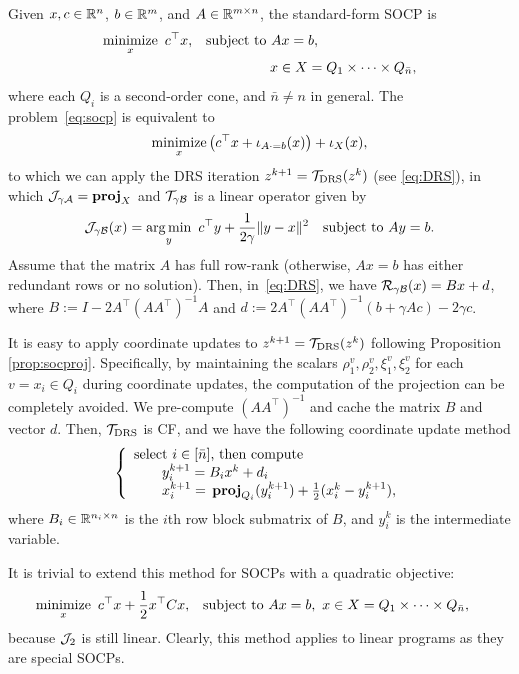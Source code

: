 {{{Given $x,c\in\mathbb{R}^n$, $b\in\mathbb{R}^m$, and $A\in\mathbb{R}^{m\times n}$, the standard-form SOCP is
\begin{subequations}\label{eq:socp}
\begin{align}
\Min_x~c^\top x,&\quad\St~ Ax=b,\\
&\hspace{56pt} x\in X=Q_1\times \cdots\times Q_{\bar{n}},
\end{align}
\end{subequations}
where each $Q_i$ is a second-order cone, and $\bar{n}\not=n$ in general.
The problem~\eqref{eq:socp} is equivalent to 
$$\operatorname*{minimize}_x \big(c^\top  x+\iota_{A\cdot =b}(x)\big)+\iota_X(x),$$
to which we can apply the DRS iteration $z^{k+1} = {{\mathcal{T}}_{\mathrm{DRS}}} (z^k)$ (see \eqref{eq:DRS}), in which ${\mathcal{J}}_{\gamma {\mathcal{A}}} = {\mathbf{proj}}_X$ and ${\mathcal{T}}_{\gamma {\mathcal{B}}}$ is a linear operator given by 
$${\mathcal{J}}_{\gamma {\mathcal{B}}} (x) = \operatorname*{arg\,min}_y ~ c^\top y+  \frac{1}{2\gamma}\|y-x\|^2\quad {\mathrm{subject~to}}~ Ay=b.$$
Assume that the matrix $A$ has full row-rank (otherwise, $Ax=b$ has either redundant rows or no solution). 
Then, in~\eqref{eq:DRS}, we have ${\mathcal{R}}_{\gamma {\mathcal{B}}}(x)= Bx+d$, where $B:=I-2A^\top (AA^\top )^{-1}A$ and $d:=2A^\top (AA^\top )^{-1}(b+\gamma Ac)-2\gamma c$.

It is easy to apply coordinate updates to $z^{k+1} = {{\mathcal{T}}_{\mathrm{DRS}}} (z^k)$ following Proposition \ref{prop:socproj}. Specifically, by maintaining the scalars $\rho_1^v,\rho_2^v,\xi_1^v,\xi_2^v$ for each $v=x_i\in Q_i$ during  coordinate updates, the computation of the projection can be completely avoided. We pre-compute $(AA^\top )^{-1}$ and cache the matrix $B$ and vector $d$. Then, ${{\mathcal{T}}_{\mathrm{DRS}}}$ is CF, and we have the following coordinate update method
\begin{equation}\label{cf-cone}
{\left\{
\begin{array}{l}
\text{select $i \in [\bar{n}]$, then compute}\\
\qquad y^{k+1}_i = B_i x^k + d_i \\
\qquad x_i^{k+1}=\,\prj_{Q_i}(y_i^{k+1}) + \frac{1}{2} ( x_i^k - y_i^{k+1}), \\
\end{array}
\right.
}\end{equation}
where $B_i \in \mathbb{R}^{n_i \times n}$ is the $i$th row block submatrix of $B$, and $y_i^k$ is the intermediate variable. 


It is trivial to extend this method for  SOCPs with a quadratic objective:
\begin{align*}
\Min_x~c^\top x+\frac{1}{2}x^\top Cx,&\quad\St~ Ax=b,~ x\in X=Q_1\times \cdots\times Q_{\bar{n}},
\end{align*}
because ${\mathcal{J}}_2$ is still linear.  Clearly, this method applies to linear programs as they are special SOCPs.

}}}
